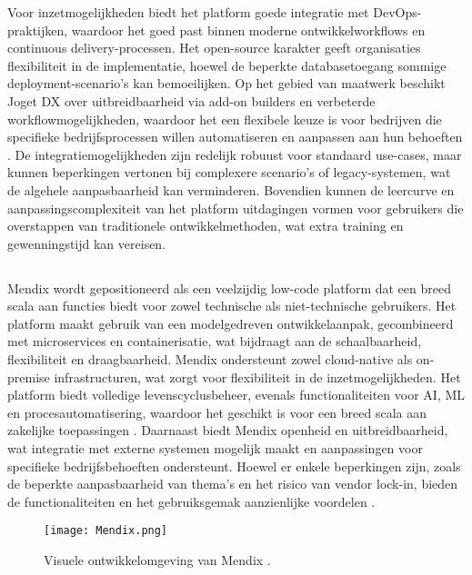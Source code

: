 Voor inzetmogelijkheden biedt het platform goede integratie met DevOps-praktijken, waardoor het goed past binnen moderne ontwikkelworkflows en continuous delivery-processen. Het open-source karakter geeft organisaties flexibiliteit in de implementatie, hoewel de beperkte databasetoegang sommige deployment-scenario's kan bemoeilijken. Op het gebied van maatwerk beschikt Joget DX over uitbreidbaarheid via add-on builders en verbeterde workflowmogelijkheden, waardoor het een flexibele keuze is voor bedrijven die specifieke bedrijfsprocessen willen automatiseren en aanpassen aan hun behoeften \autocite{Sido2024}. De integratiemogelijkheden zijn redelijk robuust voor standaard use-cases, maar kunnen beperkingen vertonen bij complexere scenario's of legacy-systemen, wat de algehele aanpasbaarheid kan verminderen. Bovendien kunnen de leercurve en aanpassingscomplexiteit van het platform uitdagingen vormen voor gebruikers die overstappen van traditionele ontwikkelmethoden, wat extra training en gewenningstijd kan vereisen.
\subsection{}
Mendix wordt gepositioneerd als een veelzijdig low-code platform dat een breed scala aan functies biedt voor zowel technische als niet-technische gebruikers. Het platform maakt gebruik van een modelgedreven ontwikkelaanpak, gecombineerd met microservices en containerisatie, wat bijdraagt aan de schaalbaarheid, flexibiliteit en draagbaarheid. Mendix ondersteunt zowel cloud-native als on-premise infrastructuren, wat zorgt voor flexibiliteit in de inzetmogelijkheden. Het platform biedt volledige levenscyclusbeheer, evenals functionaliteiten voor \gls{AI}, \gls{ML} en procesautomatisering, waardoor het geschikt is voor een breed scala aan zakelijke toepassingen \autocite{Sido2024}. Daarnaast biedt Mendix openheid en uitbreidbaarheid, wat integratie met externe systemen mogelijk maakt en aanpassingen voor specifieke bedrijfsbehoeften ondersteunt. Hoewel er enkele beperkingen zijn, zoals de beperkte aanpasbaarheid van thema's en het risico van vendor lock-in, bieden de functionaliteiten en het gebruiksgemak aanzienlijke voordelen \autocite{Sido2024}.

\begin{figure}[H]
    \centering
    \texttt{[image: Mendix.png]}
    \caption[Visuele ontwikkelomgeving Mendix]{\label{fig:Mendix} Visuele ontwikkelomgeving van Mendix \autocite{Mendix2025}.}
\end{figure}


